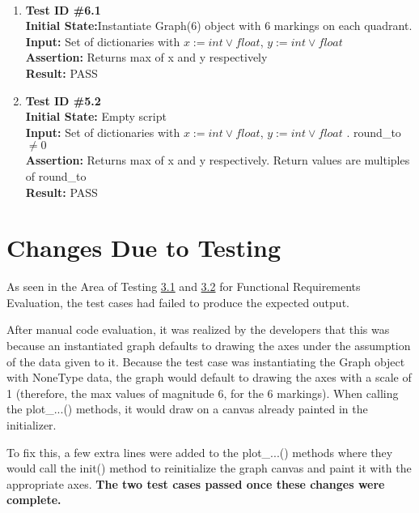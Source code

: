 \documentclass[12pt, titlepage]{article}
\begin{document}
	\paragraph{}
		\begin{enumerate}
			\item{\textbf{Test ID \#6.1\\}}
			\textbf{Initial State:}Instantiate Graph(6) object with 6 markings on each quadrant.\\
			\textbf{Input:} Set of dictionaries with $x:= int \vee float$, $y:= int \vee float$ \\
			\textbf{Assertion:} Returns max of x and y respectively\\
			\textbf{Result:} PASS
			
			\item{\textbf{Test ID \#5.2\\}}
			\textbf{Initial State:} Empty script\\
			\textbf{Input:} Set of dictionaries with $x:= int \vee float$, $y:= int \vee float$ . round\_to $\neq 0$ \\
			\textbf{Assertion:}  Returns max of x and y respectively. Return values are multiples of round\_to \\
			\textbf{Result:} PASS

		\end{enumerate}	



\section{Changes Due to Testing}

As seen in the Area of Testing \hyperref[sec:3.1]{3.1} and \hyperref[sec:3.2]{3.2} for Functional Requirements Evaluation, the test cases had failed to produce the expected output. 

After manual code evaluation, it was realized by the developers that this was because an instantiated graph defaults to drawing the axes under the assumption of the data given to it. Because the test case was instantiating the Graph object with NoneType data, the graph would default to drawing the axes with a scale of 1 (therefore, the max values of magnitude 6, for the 6 markings). When calling the plot\_...() methods, it would draw on a canvas already painted in the initializer. 

To fix this, a few extra lines were added to the plot\_...() methods where they would call the init() method to reinitialize the graph canvas and paint it with the appropriate axes. 
\textbf{The two test cases passed once these changes were complete.}  
\end{document}
